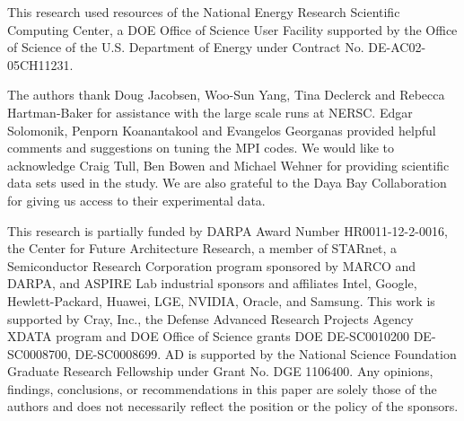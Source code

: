 This research used resources of the National Energy Research Scientific
Computing Center, a DOE Office of Science User Facility supported by the Office
of Science of the U.S. Department of Energy under Contract No.
DE-AC02-05CH11231. 

The authors thank Doug Jacobsen, Woo-Sun Yang, Tina Declerck and Rebecca
Hartman-Baker for assistance with the large scale runs at NERSC. Edgar
Solomonik, Penporn Koanantakool and Evangelos Georganas provided helpful comments
and suggestions on tuning the MPI codes. We would like to acknowledge Craig
Tull, Ben Bowen and Michael Wehner for providing scientific data sets used
in the study. We are also grateful to the Daya Bay Collaboration for giving
us access to their experimental data.

This research is partially funded by DARPA Award Number HR0011-12-2-0016, the
Center for Future Architecture Research, a member of STARnet, a Semiconductor
Research Corporation program sponsored by MARCO and DARPA, and ASPIRE Lab
industrial sponsors and affiliates Intel, Google, Hewlett-Packard, Huawei, LGE,
NVIDIA, Oracle, and Samsung.  This work is supported by Cray, Inc., the Defense
Advanced Research Projects Agency XDATA program and DOE Office of Science
grants DOE DE-SC0010200 DE-SC0008700, DE-SC0008699. AD is supported by the
National Science Foundation Graduate Research Fellowship under Grant No. DGE
1106400. Any opinions, findings, conclusions, or recommendations in this paper
are solely those of the authors and does not necessarily reflect the position
or the policy of the sponsors.
